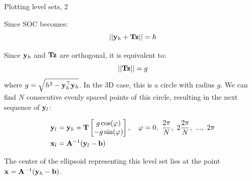 \documentclass{beamer}
\begin{document}
\begin{frame}{Plotting level sets, 2}
	\begin{flushleft}
		
		Since  SOC becomes:
		\begin{equation}
			||\mathbf{y}_h + \mathbf{T}\mathbf{z}|| = h
		\end{equation}
	
		Since $\mathbf{y}_h$ and $\mathbf{T}\mathbf{z}$ are orthogonal, it is equivalent to:
		\begin{equation}
			||\mathbf{T}\mathbf{z}|| = g
		\end{equation}
	where $g = \sqrt{ h^2 - \mathbf{y}_h^\top\mathbf{y}_h }$. In the 3D case, this is a circle with radius $g$. We can find $N$ consecutive evenly spaced points of this circle, resulting in the next sequence of $\mathbf{y}_l$:
	
		\begin{align}
			\bo{y}_l &= \bo{y}_h + \bo{T}
			\begin{bmatrix}
				g\cos(\varphi) \\ -g\sin(\varphi)
			\end{bmatrix}, \ \ \ \varphi = 0, \ \frac{2\pi}{N},\ 2\frac{2\pi}{N}, \ ..., \ 2\pi 
		\\
		\bo{x}_l  &=\bo{A}^{-1} (\bo{y}_l - \bo{b})
		\end{align}
	
		The center of the ellipsoid representing this level set lies at the point $\mathbf{x} =\mathbf{A}^{-1} (\mathbf{y}_h - \mathbf{b})$.
		
	\end{flushleft}
\end{frame}
\end{document}
